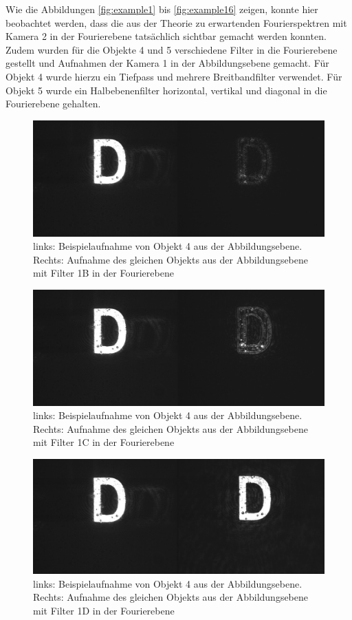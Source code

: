 Wie die Abbildungen \ref{fig:example1} bis \ref{fig:example16} zeigen, konnte hier beobachtet werden, dass die aus der Theorie zu erwartenden Fourierspektren mit Kamera 2 in der Fourierebene tatsächlich sichtbar gemacht werden konnten. 
Zudem wurden für die Objekte 4 und 5 verschiedene Filter in die Fourierebene gestellt und Aufnahmen der Kamera 1 in der Abbildungsebene gemacht. Für Objekt 4 wurde hierzu ein Tiefpass und mehrere Breitbandfilter verwendet. Für Objekt 5 wurde ein Halbebenenfilter horizontal, vertikal und diagonal in die Fourierebene gehalten. \\

\begin{figure}
\centering
\includegraphics[width=0.7\linewidth]{images/edit-xcf/example10_Filter1B}
\caption{links: Beispielaufnahme von Objekt 4 aus der Abbildungsebene. Rechts: Aufnahme des gleichen Objekts aus der Abbildungsebene mit Filter 1B in der Fourierebene}
\label{fig:example10_Filter1B}
\end{figure}

\begin{figure}
\centering
\includegraphics[width=0.7\linewidth]{images/edit-xcf/example11_Filter1C}
\caption{links: Beispielaufnahme von Objekt 4 aus der Abbildungsebene. Rechts: Aufnahme des gleichen Objekts aus der Abbildungsebene mit Filter 1C in der Fourierebene}
\label{fig:example11_Filter1C}
\end{figure}

\begin{figure}
\centering
\includegraphics[width=0.7\linewidth]{images/edit-xcf/example12_Filter1D}
\caption{links: Beispielaufnahme von Objekt 4 aus der Abbildungsebene. Rechts: Aufnahme des gleichen Objekts aus der Abbildungsebene mit Filter 1D in der Fourierebene}
\label{fig:example12_Filter1D}
\end{figure}

